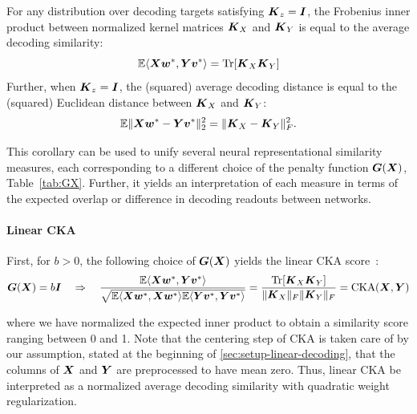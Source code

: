\begin{corollary}\label{corollary:new}
For any distribution over decoding targets satisfying $\boldsymbol{K}_z = \boldsymbol{I}$, the Frobenius inner product between normalized kernel matrices $\boldsymbol{K}_X$ and $\boldsymbol{K}_Y$ is equal to the average decoding similarity:
\begin{equation}
\mathbb{E} \langle \boldsymbol{X} \boldsymbol{w}^* , \boldsymbol{Y} \boldsymbol{v}^* \rangle = \operatorname*{Tr}[\boldsymbol{K}_X \boldsymbol{K}_Y]
\end{equation}
Further, when $\boldsymbol{K}_z = \boldsymbol{I}$, the (squared) average decoding distance is equal to the (squared) Euclidean distance between $\boldsymbol{K}_X$ and $\boldsymbol{K}_Y$:
\vspace{2mm}
\begin{equation}\label{eq:decoding_metric}
\mathbb{E} \Vert \boldsymbol{X} \boldsymbol{w}^* - \boldsymbol{Y} \boldsymbol{v}^* \Vert^2_2 = \Vert \boldsymbol{K}_X - \boldsymbol{K}_Y  \Vert_F^2.
\end{equation}  
\end{corollary}

This corollary can be used to unify several neural representational similarity measures, each corresponding to a different choice of the penalty function $\boldsymbol{G}(\boldsymbol{X})$, Table~\ref{tab:GX}.
Further, it yields an interpretation of each measure in terms of the expected overlap or difference in decoding readouts between networks.

\paragraph{Linear CKA}
First, for $b > 0$, the following choice of $\boldsymbol{G}(\boldsymbol{X})$ yields the linear CKA score~\cite{cortes2012,kornblith2019}:
\begin{equation*}
\boldsymbol{G}(\boldsymbol{X}) = b \boldsymbol{I} \quad \Rightarrow \quad \frac{\mathbb{E} \langle \boldsymbol{X} \boldsymbol{w}^*, \boldsymbol{Y} \boldsymbol{v}^* \rangle}{\sqrt{\mathbb{E} \langle \boldsymbol{X} \boldsymbol{w}^*, \boldsymbol{X} \boldsymbol{w}^* \rangle \mathbb{E} \langle \boldsymbol{Y} \boldsymbol{v}^*, \boldsymbol{Y} \boldsymbol{v}^* \rangle}} = \frac{\operatorname*{Tr}[\boldsymbol{K}_X\boldsymbol{K}_Y]}{\Vert \boldsymbol{K}_X \Vert_F \Vert \boldsymbol{K}_Y \Vert_F} = \text{CKA}(\boldsymbol{X}, \boldsymbol{Y})
\end{equation*}

where we have normalized the expected inner product to obtain a similarity score ranging between 0 and 1.
Note that the centering step of CKA is taken care of by our assumption, stated at the beginning of \cref{sec:setup-linear-decoding}, that the columns of $\boldsymbol{X}$ and $\boldsymbol{Y}$ are preprocessed to have mean zero. 
Thus, linear CKA be interpreted as a normalized average decoding similarity with quadratic weight regularization.

